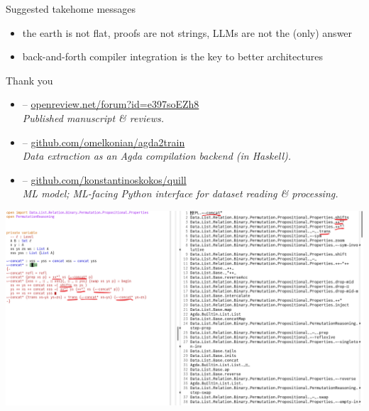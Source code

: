 \documentclass[aspectratio=169]{beamer}
\newcommand{\light}[1]{\textcolor{light}{#1}}
\begin{document}
\begin{frame}{Suggested takehome messages}
	\smaller
	\vspace{3em}
	\begin{itemize}
		\item[\emoji{earth-africa}] the earth is not flat, proofs are not strings, LLMs are not the (only) answer
		\item[\emoji{key}] back-and-forth compiler integration is the key to better architectures
	\end{itemize}\vfill
	
	\hfill Thank you\vfill	
	
	\begin{itemize}
		\item {}  -- \href{https://openreview.net/forum?id=e397soEZh8}{openreview.net/forum?id=e397soEZh8}\\
		\light{\textit{Published manuscript \& reviews.}}
		\item {} -- \href{https://github.com/omelkonian/agda2train}{github.com/omelkonian/agda2train}\\
		\light{\textit{Data extraction as an Agda \textit{compilation backend} (in Haskell).}}
		\item {} -- \href{https://github.com/konstantinosKokos/quill}{github.com/konstantinoskokos/quill}\\
		\light{\textit{ML model; ML-facing Python interface for dataset reading \& processing.}}
	\end{itemize}\vfill
\end{frame}

\begin{frame}[plain]
	\includegraphics[width=\textwidth]{interface.png}
\end{frame}
\end{document}
